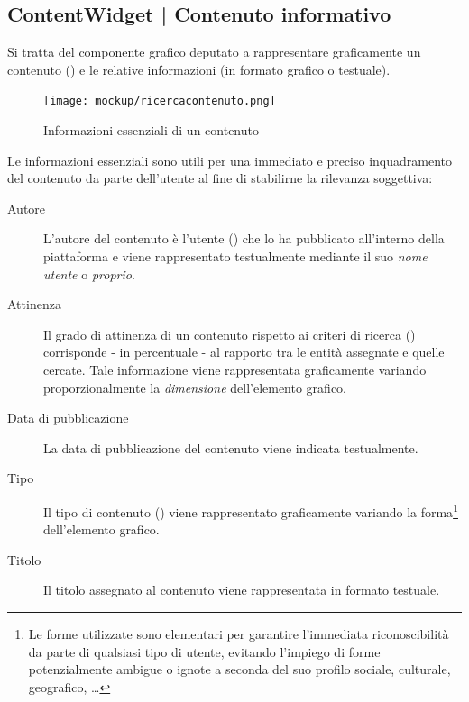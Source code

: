\documentclass[10pt,a4paper,headinclude,footinclude,hidelinks]{scrreprt} %
\begin{document}
	\subsection[ContentWidget]{ContentWidget | Contenuto informativo}
	\label{sec:stage:design:sistema:view:content-widget}
	Si tratta del componente grafico deputato a rappresentare graficamente un contenuto (\textit{}) e le relative informazioni (in formato grafico o testuale).

	\begin{figure}[ht]
		\begin{center}
	    	\texttt{[image: mockup/ricercacontenuto.png]}
			\label{gfx:mockup:content}
			\caption{Informazioni essenziali di un contenuto}
		\end{center}
	\end{figure}

	Le informazioni essenziali sono utili per una immediato e preciso inquadramento del contenuto da parte dell'utente al fine di stabilirne la rilevanza soggettiva:
	\begin{description}
	\item[Autore] L'autore del contenuto è l'utente (\textit{}) che lo ha pubblicato all'interno della piattaforma e viene rappresentato testualmente mediante il suo \textit{nome utente} o \textit{proprio}.
	\item[Attinenza] Il grado di attinenza di un contenuto rispetto ai criteri di ricerca (\textit{}) corrisponde - in percentuale - al rapporto tra le entità assegnate e quelle cercate. Tale informazione viene rappresentata graficamente variando proporzionalmente la \textit{dimensione} dell'elemento grafico.
	\item[Data di pubblicazione] La data di pubblicazione del contenuto viene indicata testualmente.
	\item[Tipo] Il tipo di contenuto (\textit{}) viene rappresentato graficamente variando la forma\footnote{Le forme utilizzate sono elementari per garantire l'immediata riconoscibilità da parte di qualsiasi tipo di utente, evitando l'impiego di forme potenzialmente ambigue o ignote a seconda del suo profilo sociale, culturale, geografico, \ldots} dell'elemento grafico.
	\item[Titolo] Il titolo assegnato al contenuto viene rappresentata in formato testuale.
	\end{description}
\end{document}
